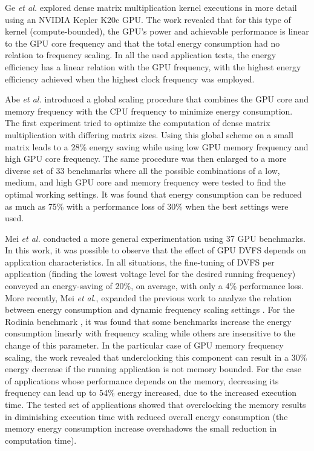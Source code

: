 Ge \textit{et al.} \cite{ge_effects_2013} explored dense matrix multiplication kernel executions in more detail using an NVIDIA Kepler K20c GPU.  The work revealed that for this type of kernel (compute-bounded), the GPU's power and achievable performance is linear to the GPU core frequency and that the total energy consumption had no relation to frequency scaling. In all the used application tests, the energy efficiency has a linear relation with the GPU frequency, with the highest energy efficiency achieved when the highest clock frequency was employed.

Abe \textit{et al.} \cite{abe_power_2012} introduced a global scaling procedure that combines the GPU core and memory frequency with the CPU frequency to minimize energy consumption. The first experiment tried to optimize the computation of dense matrix multiplication with differing matrix sizes. Using this global scheme on a small matrix leads to a 28\% energy saving while using low GPU memory frequency and high GPU core frequency. The same procedure was then enlarged to a more diverse set of 33 benchmarks where all the possible combinations of a low, medium, and high GPU core and memory frequency were tested to find the optimal working settings. It was found that energy consumption can be reduced as much as 75\% with a performance loss of 30\% when the best settings were used. 

Mei \textit{et al.} \cite{mei_measurement_2013} conducted a more general experimentation using 37 GPU benchmarks. In this work, it was possible to observe that the effect of GPU DVFS depends on application characteristics. In all situations, the fine-tuning of DVFS per application (finding the lowest voltage level for the desired running frequency) conveyed an energy-saving of 20\%, on average, with only a 4\% performance loss. More recently, Mei  \textit{et al.}, expanded the previous work to analyze the relation between energy consumption and dynamic frequency scaling settings \cite{mei_survey_2016}. For the  Rodinia benchmark \cite{che_rodinia:_2009}, it was found that some benchmarks increase the energy consumption linearly with frequency scaling while others are insensitive to the change of this parameter. In the particular case of GPU memory frequency scaling, the work revealed that underclocking this component can result in a 30\% energy decrease if the running application is not memory bounded. For the case of applications whose performance depends on the memory, decreasing its frequency can lead up to 54\% energy increased, due to the increased execution time. The tested set of applications showed that overclocking the memory results in diminishing execution time with reduced overall energy consumption (the memory energy consumption increase overshadows the small reduction in computation time). 

